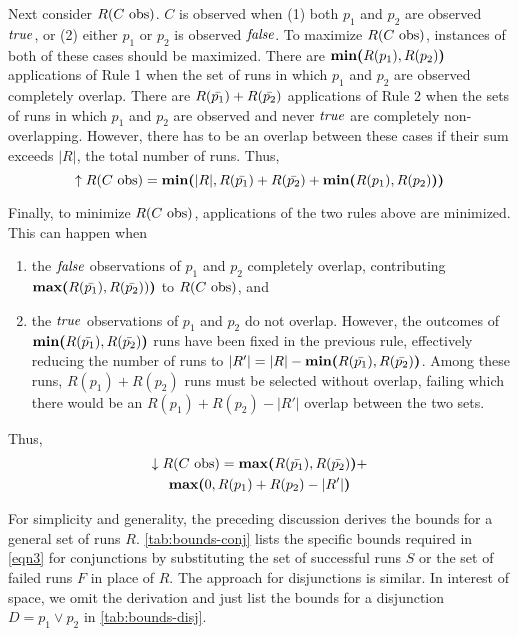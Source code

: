 Next consider $R(\text{$C$ obs})$.  $C$ is observed when (1) both $p_1$ and
$p_2$ are observed $\mathit{true}$, or (2) either $p_1$ or $p_2$ is observed
$\mathit{false}$.
To maximize $R(\text{$C$ obs})$, instances of both of these cases should be
maximized.
There are $\textbf{min(}R(p_1), R(p_2)\textbf{)}$ applications of Rule 1 when the set
of runs in which $p_1$ and $p_2$ are observed completely overlap.
There are $R(\text{$\bar{p_1}$}) + R(\text{$\bar{p_2}$})$ applications of Rule
2 when the sets of runs in which $p_1$ and $p_2$ are observed and never $\mathit{true}$ are
completely non-overlapping.
However, there has to be an overlap between these cases if their sum exceeds
$|R|$, the total number of runs.  Thus,
\begin{equation*}
  \uparrow R(\text{$C$ obs}) = \textbf{min(}|R|, R(\text{$\bar{p_1}$}) + R(\text{$\bar{p_2}$})
                   + \textbf{min(}R(p_1), R(p_2)\textbf{)}\textbf{)}
\end{equation*}

Finally, to minimize $R(\text{$C$ obs})$, applications of the two rules above are
minimized.  This can happen when
\begin{enumerate}
\item the $\mathit{false}$ observations of $p_1$ and $p_2$ completely overlap, contributing
$\textbf{max(}R(\text{$\bar{p_1}$}), R(\text{$\bar{p_2}$}))\textbf{)}$ to $R(\text{$C$ obs})$, and
\item the $\mathit{true}$ observations of $p_1$ and $p_2$ do not overlap.
However, the outcomes of $\textbf{min(}R(\text{$\bar{p_1}$}), R(\text{$\bar{p_2}$})\textbf{)}$ runs have
been fixed in the previous rule, effectively reducing the number of runs to
$|R'| = |R| - \textbf{min(}R(\text{$\bar{p_1}$}), R(\text{$\bar{p_2}$})\textbf{)}$.  Among these runs,
$R(p_1) + R(p_2)$
runs must be selected without overlap, failing which there would be an
$R(p_1) + R(p_2) - |R'|$ overlap
between the two sets.
\end{enumerate}

Thus,
\begin{multline*}
  \downarrow R(\text{$C$ obs}) = \textbf{max(}R(\text{$\bar{p_1}$}), R(\text{$\bar{p_2}$})\textbf{)} + \\
  \textbf{max(}0, R(p_1) + R(p_2) - |R'|\textbf{)}
\end{multline*}

For simplicity and generality, the preceding discussion derives the
bounds for a general set of runs $R$.  \autoref{tab:bounds-conj} lists
the specific bounds required in \autoref{eqn3} for conjunctions by
substituting the set of successful runs $S$ or the set of failed runs
$F$ in place of $R$.  The approach for disjunctions is similar.  In
interest of space, we omit the derivation and just list the bounds for
a disjunction $D = p_1 \vee p_2$ in \autoref{tab:bounds-disj}.

